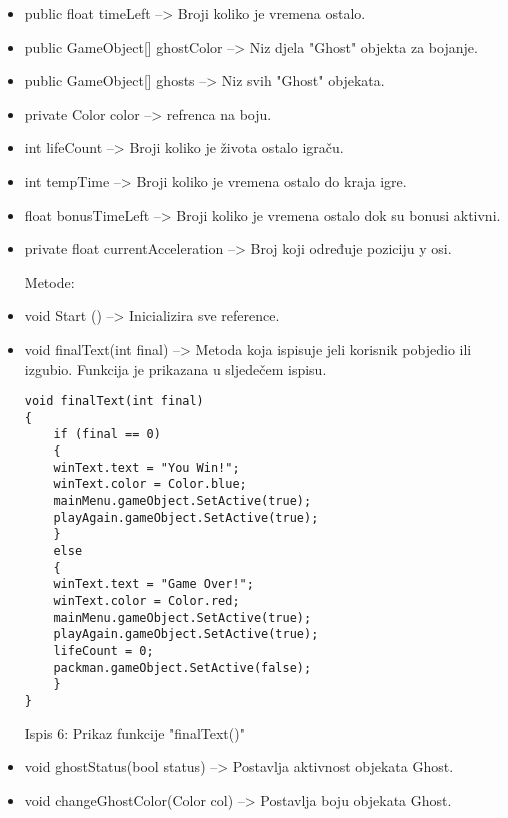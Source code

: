 \begin{itemize}
\item public float timeLeft --> Broji koliko je vremena ostalo.

\item public GameObject[] ghostColor --> Niz djela "Ghost" objekta za bojanje.

\item public GameObject[] ghosts --> Niz svih "Ghost" objekata.
\item private Color color --> refrenca na boju.

\item int lifeCount --> Broji koliko je života ostalo igraču.

\item int tempTime --> Broji koliko je vremena ostalo do kraja igre.

\item float bonusTimeLeft --> Broji koliko je vremena ostalo dok su bonusi aktivni.

\item private float currentAcceleration --> Broj koji određuje poziciju y osi.

Metode:


\item void Start () --> Inicializira sve reference.

\item void finalText(int final) --> Metoda koja ispisuje jeli korisnik pobjedio ili izgubio.
 Funkcija je prikazana u sljedečem ispisu.

\begin{verbatim}
void finalText(int final)
{
	if (final == 0)
	{
	winText.text = "You Win!";
	winText.color = Color.blue;
	mainMenu.gameObject.SetActive(true);
	playAgain.gameObject.SetActive(true);
	}
	else
	{
	winText.text = "Game Over!";
	winText.color = Color.red;
	mainMenu.gameObject.SetActive(true);
	playAgain.gameObject.SetActive(true);
	lifeCount = 0;
	packman.gameObject.SetActive(false);
	}
}
\end{verbatim}
\begin{center}
	
	Ispis 6: Prikaz funkcije "finalText()"
\end{center}



\item void ghostStatus(bool status) --> Postavlja aktivnost objekata Ghost.

\item void changeGhostColor(Color col) --> Postavlja boju objekata Ghost.


\end{itemize}
